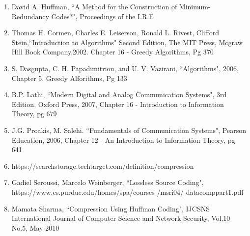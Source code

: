 \begin{enumerate}
\item{David A. Huffman, ``A Method for the Construction of Minimum-Redundancy Codes*", Proceedings of the I.R.E}
\item{Thomas H. Cormen, Charles E. Leiserson, Ronald L. Rivest, Clifford Stein,``Introduction to Algorithms" Second Edition, The MIT Press, Mcgraw Hill Book Company,2002. Chapter 16 - Greedy Algorithms, Pg 370}
\item{S. Dasgupta, C. H. Papadimitriou, and U. V. Vazirani, ``Algorithms", 2006, Chapter 5, Greedy Alforithms, Pg 133}
\item{B.P. Lathi, ``Modern Digital and Analog Communication Systems", 3rd Edition, Oxford Press, 2007, Chapter 16 - Introduction to Information Theory, pg 679}
\item{J.G. Proakis, M. Salehi. ``Fundamentals of Communication Systems", Pearson Education, 2006, Chapter 12 - An Introduction to Information Theory, pg 641}
\item{https://searchstorage.techtarget.com/definition/compression}
\item{Gadiel Seroussi, Marcelo Weinberger, ``Lossless Source Coding", https://www.cs.purdue.edu/homes/spa/courses /msri04/ datacomppart1.pdf}
\item{Mamata Sharma, ``Compression Using Huffman Coding", IJCSNS International Journal of Computer Science and Network Security, Vol.10 No.5, May 2010 } 
\end{enumerate}